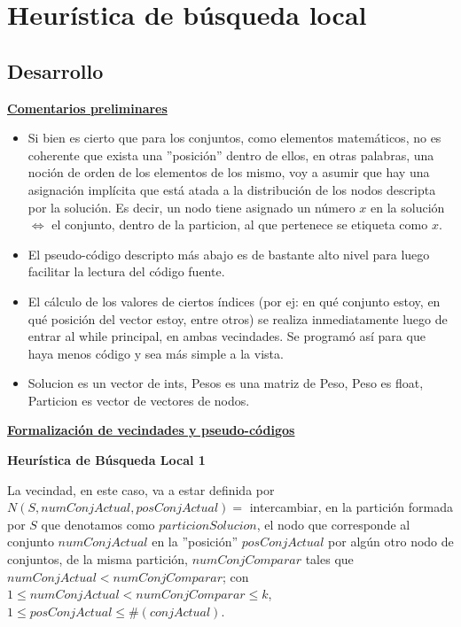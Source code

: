 \section{Heurística de búsqueda local}
\subsection{Desarrollo}
\noindent \textbf{\underline{Comentarios preliminares}}
\hfill \newline
\begin{itemize}
\item Si bien es cierto que para los conjuntos, como elementos matemáticos, no es coherente que exista una ''posición'' dentro de ellos, en otras palabras, una noción de orden de los elementos de los mismo, voy a asumir que hay una asignación implícita que está atada a la distribución de los nodos descripta por la solución. Es decir, un nodo tiene asignado un número $x$ en la solución $\iff$ el conjunto, dentro de la particion, al que pertenece se etiqueta como $x$.
\item El pseudo-código descripto más abajo es de bastante alto nivel para luego facilitar la lectura del código fuente.
\item El cálculo de los valores de ciertos índices (por ej: en qué conjunto estoy, en qué posición del vector estoy, entre otros) se realiza inmediatamente luego de entrar al while principal, en ambas vecindades. Se programó así para que haya menos código y sea más simple a la vista.
\item Solucion es un vector de ints, Pesos es una matriz de Peso, Peso es float, Particion es vector de vectores de nodos.
\end{itemize}
\hfill \newline
\textbf{\underline{Formalización de vecindades y pseudo-códigos}}
\hfill \newline

\textbf{Heurística de Búsqueda Local 1}

La vecindad, en este caso, va a estar definida por $N(S, numConjActual, posConjActual) = $ intercambiar, en la partición formada por $S$ que denotamos como $particionSolucion$, el nodo que corresponde al conjunto $numConjActual$ en la ''posición'' $posConjActual$ por algún otro nodo de conjuntos, de la misma partición, $numConjComparar$ tales que $numConjActual < numConjComparar$; \newline con $1 \leq numConjActual < numConjComparar \leq k$, $1 \leq posConjActual \leq \#(conjActual)$.

